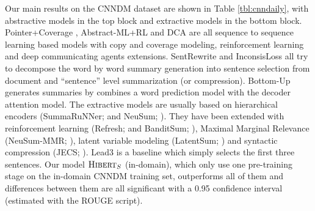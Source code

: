 \documentclass[11pt,a4paper]{article}
\begin{document}
Our main results on the CNNDM dataset are shown in Table \ref{tbl:cnndaily}, with abstractive models in the top block and extractive models in the bottom block. Pointer+Coverage \cite{see:2017:acl}, Abstract-ML+RL \cite{paulus:2017:arxiv} and DCA \cite{celikyilmaz:2016:naacl} are all sequence to sequence learning based models with copy and coverage modeling, reinforcement learning and deep communicating agents extensions. SentRewrite \cite{hsu:2018:acl} and \mbox{InconsisLoss} \cite{chen:2018:acl} all try to decompose the word by word summary generation into sentence selection from document and ``sentence'' level summarization (or compression). \mbox{Bottom-Up} \cite{gehrmann:2018:emnlp} generates summaries by combines a word prediction model with the decoder attention model. The extractive models are usually based on hierarchical encoders (SummaRuNNer; \citealt{nallapati:2017:aaai} and NeuSum; \citealt{cheng:2016:acl}). They have been extended with reinforcement learning (Refresh; \citealt{Narayan:ea:2018} and BanditSum; \citealt{dong:2018:emnlp}), Maximal Marginal Relevance (NeuSum-MMR; \citealt{zhou:2018:acl}), latent variable modeling (LatentSum; \citealt{zhang:2018:emnlp}) and syntactic compression (JECS; \citealt{xu:2019:arxiv}). Lead3 is a baseline which simply selects the first three sentences. Our model $\text{\sc Hibert}_S$ (in-domain), which only use one pre-training stage on the in-domain CNNDM training set, outperforms all of them and differences between them are all significant with a 0.95 confidence interval (estimated with the ROUGE script).
\end{document}
